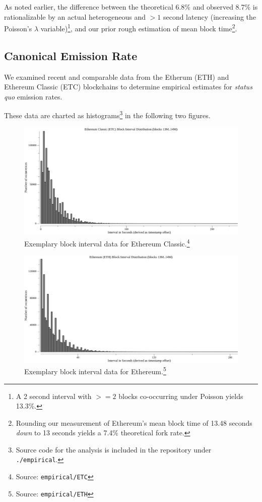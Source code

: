 \documentclass[11pt]{article}
\theoremstyle{plain}
\begin{document}
As noted earlier, the difference between the theoretical 6.8\% and observed 8.7\% is rationalizable by
an actual heterogeneous and $>1$ second latency (increasing the Poisson's $\lambda$ variable)\footnote{
    A 2 second interval with $>=2$ blocks co-occurring under Poisson yields 13.3\%.
}, and our prior rough estimation of mean block time\footnote{
    Rounding our measurement of Ethereum's mean block time of 13.48 seconds \emph{down} to 13 seconds
    yields a 7.4\% theoretical fork rate.
}.

\subsection{\normalsize{Canonical Emission Rate}}

We examined recent and comparable data from the Etherum (ETH) and Ethereum Classic (ETC) blockchains
to determine empirical estimates for \emph{status quo} emission rates.

These data are charted as histograms\footnote{
    Source code for the analysis is included in the repository under \texttt{./empirical}.
} in the following two figures.

\begin{figure}[tph!]
    \centering
    \includegraphics[width=1.0\textwidth]{vis_data_blockinterval_distribution_ETC.png}
    \caption{
        Exemplary block interval data for Ethereum Classic.\footnote{Source: \texttt{empirical/ETC}}
    }
\end{figure}

\begin{figure}[tph!]
    \centering
    \includegraphics[width=1.0\textwidth]{vis_data_blockinterval_distribution_ETH.png}
    \caption{
        Exemplary block interval data for Ethereum.\footnote{Source: \texttt{empirical/ETH}}
    }
\end{figure}
\end{document}
